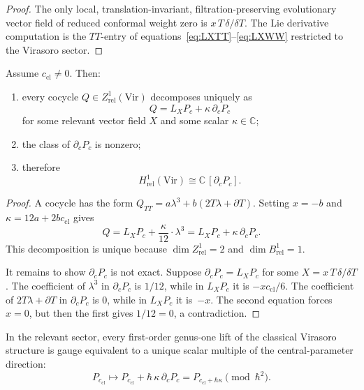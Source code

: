\begin{proof}
The only local, translation-invariant, filtration-preserving evolutionary
vector field of reduced conformal weight zero is $x\,T\,\delta/\delta T$.
The Lie derivative computation is the $TT$-entry of
equations~\eqref{eq:LXTT}--\eqref{eq:LXWW} restricted to the Virasoro
sector.
\end{proof}

\begin{theorem}
\label{thm:H1-virasoro}
Assume $c_{\mathrm{cl}}\neq 0$. Then:
\begin{enumerate}[leftmargin=2.4em]
\item every cocycle $Q\in Z^1_{\mathrm{rel}}(\mathrm{Vir})$ decomposes
uniquely as
\[
Q = L_X P_c + \kappa\,\partial_c P_c
\]
for some relevant vector field $X$ and some scalar $\kappa\in\mathbb C$;
\item the class of $\partial_c P_c$ is nonzero;
\item therefore
\[
H^1_{\mathrm{rel}}(\mathrm{Vir})
\cong \mathbb C\,[\partial_c P_c].
\]
\end{enumerate}
\end{theorem}

\begin{proof}
A cocycle has the form $Q_{TT}=a\lambda^3+b(2T\lambda+\partial T)$.
Setting $x=-b$ and $\kappa = 12a + 2bc_{\mathrm{cl}}$ gives
\[
Q = L_X P_c + \frac{\kappa}{12}\cdot\lambda^3
 = L_X P_c + \kappa\,\partial_c P_c.
\]
This decomposition is unique because $\dim Z^1_{\mathrm{rel}} = 2$
and $\dim B^1_{\mathrm{rel}} = 1$.

It remains to show $\partial_c P_c$ is not exact.
Suppose $\partial_c P_c = L_X P_c$ for some $X = x\,T\,\delta/\delta T$.
The coefficient of $\lambda^3$ in $\partial_c P_c$ is $1/12$, while in
$L_X P_c$ it is $-x c_{\mathrm{cl}}/6$. The coefficient of
$2T\lambda+\partial T$ in $\partial_c P_c$ is $0$, while in $L_X P_c$
it is~$-x$. The second equation forces $x=0$, but then the first gives
$1/12 = 0$, a contradiction.
\end{proof}

\begin{corollary}
\label{cor:virasoro-unique-lift}
In the relevant sector, every first-order genus-one lift of the classical
Virasoro structure is gauge equivalent to a unique scalar multiple of the
central-parameter direction:
\[
P_{c_{\mathrm{cl}}} \longmapsto P_{c_{\mathrm{cl}}} + \hbar\,\kappa\,\partial_c P_c
= P_{c_{\mathrm{cl}}+\hbar\kappa} \pmod{\hbar^2}.
\]
\end{corollary}


